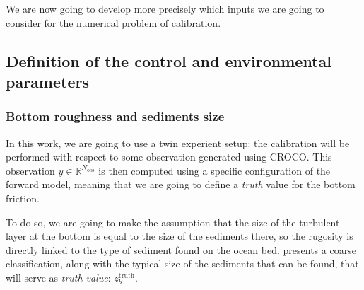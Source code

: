 \documentclass[../../Main_ManuscritThese.tex]{subfiles}
\newcommand{\zob}{z_b}
\begin{document}
We are now going to develop more precisely which inputs we are going
to consider for the numerical problem of calibration.


\subsection{Definition of the control and environmental parameters}
\subsubsection{Bottom roughness and sediments size}
In this work, we are going to use a twin experient setup: the
calibration will be performed with respect to some observation
generated using CROCO.  This observation
$y\in\mathbb{R}^{N_{\mathrm{obs}}}$ is then computed using a specific
configuration of the forward model, meaning that we are going to
define a \emph{truth} value for the bottom friction.


To do so, we are going to make the assumption that the size of the
turbulent layer at the bottom is equal to the size of the sediments
there, so the rugosity is directly linked to the type of sediment
found on the ocean bed.  presents a coarse
classification, along with the typical size of the sediments that can
be found, that will serve as \emph{truth value}:
$\zob^{\mathrm{truth}}$.  %
\end{document}
